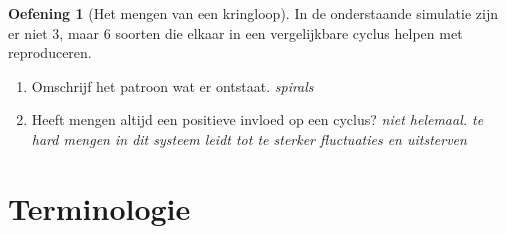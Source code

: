 \documentclass[
  a4paper,
]{scrbook}
\providecommand{\tightlist}{%
  \setlength{\itemsep}{0pt}\setlength{\parskip}{0pt}}\usepackage{longtable,booktabs,array}
\theoremstyle{definition}
\newtheorem{exercise}{Oefening}[chapter]
\theoremstyle{remark}
\begin{document}
\begin{exercise}[Het mengen van een
kringloop]
In de onderstaande simulatie zijn er niet 3, maar 6 soorten die elkaar
in een vergelijkbare cyclus helpen met reproduceren.

\begin{enumerate}
\def\labelenumi{\alph{enumi}.}
\setcounter{enumi}{2}
\tightlist
\item
  Omschrijf het patroon wat er ontstaat. \emph{spirals}
\item
  Heeft mengen altijd een positieve invloed op een cyclus? \emph{niet
  helemaal. te hard mengen in dit systeem leidt tot te sterker
  fluctuaties en uitsterven}
\end{enumerate}

\section{Terminologie}\label{terminologie-4}


\end{exercise}
\end{document}
